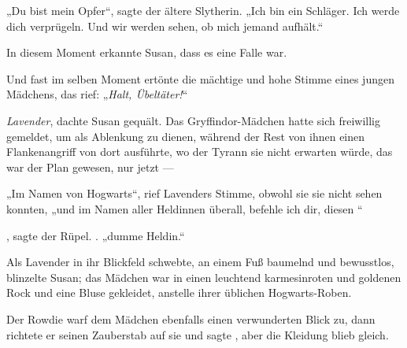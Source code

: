 „Du bist mein Opfer“, sagte der ältere Slytherin.
„Ich bin ein Schläger. Ich werde dich verprügeln. Und wir werden sehen, ob mich jemand aufhält.“

In diesem Moment erkannte Susan, dass es eine Falle war.

Und fast im selben Moment ertönte die mächtige und hohe Stimme eines jungen Mädchens, das rief:
„\emph{Halt, Übeltäter!}“ 

\emph{Lavender}, dachte Susan gequält. Das Gryffindor-Mädchen hatte sich freiwillig gemeldet, um als Ablenkung zu dienen, während der Rest von ihnen einen Flankenangriff von dort ausführte, wo der Tyrann sie nicht erwarten würde, das war der Plan gewesen, nur jetzt —

„Im Namen von Hogwarts“, rief Lavenders Stimme, obwohl sie sie nicht sehen konnten, „und im Namen aller Heldinnen überall, befehle ich dir, diesen “

, sagte der Rüpel. .  „dumme Heldin.“

Als Lavender in ihr Blickfeld schwebte, an einem Fuß baumelnd und bewusstlos, blinzelte Susan; das Mädchen war in einen leuchtend karmesinroten und goldenen Rock und eine Bluse gekleidet, anstelle ihrer üblichen Hogwarts-Roben.

Der Rowdie warf dem Mädchen ebenfalls einen verwunderten Blick zu, dann richtete er seinen Zauberstab auf sie und sagte , aber die Kleidung blieb gleich.

